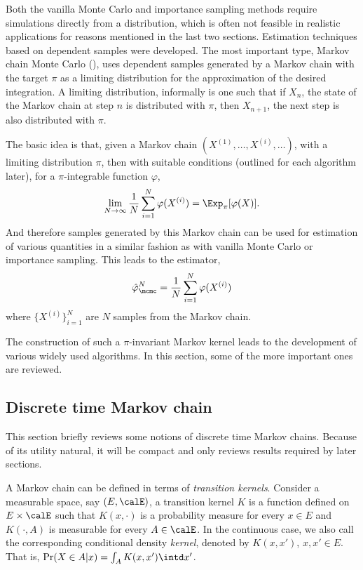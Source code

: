 Both the vanilla Monte Carlo and importance sampling methods require
simulations directly from a distribution, which is often not feasible in
realistic applications for reasons mentioned in the last two sections.
Estimation techniques based on dependent samples were developed. The most
important type, Markov chain Monte Carlo (\mcmc), uses dependent samples
generated by a Markov chain with the target $\pi$ as a limiting distribution
for the approximation of the desired integration. A limiting distribution,
informally is one such that if $X_n$, the state of the Markov chain at step
$n$ is distributed with $\pi$, then $X_{n+1}$, the next step is also
distributed with $\pi$.

The basic idea is that, given a Markov chain $(X^{(1)},\dots,X^{(i)},\dots)$,
with a limiting distribution $\pi$, then with suitable conditions (outlined
for each algorithm later), for a $\pi$-integrable function $\varphi$,
\begin{equation}
  \lim_{N\to\infty}\frac{1}{N}\sum_{i=1}^N\varphi(X^{(i)}) =
  \Exp_{\pi}[\varphi(X)].
  \label{eq:mcmc convergence}
\end{equation}
And therefore samples generated by this Markov chain can be used for
estimation of various quantities in a similar fashion as with vanilla Monte
Carlo or importance sampling. This leads to the estimator,
\begin{equation}
  \hat\varphi_{\mcmc}^N = \frac{1}{N}\sum_{i=1}^N\varphi(X^{(i)})
  \label{eq:mcmc est}
\end{equation}
where $\{X^{(i)}\}_{i=1}^N$ are $N$ samples from the Markov chain.

The construction of such a $\pi$-invariant Markov kernel leads to the
development of various widely used \mcmc algorithms. In this section, some of
the more important ones are reviewed.

\subsection{Discrete time Markov chain}
\label{sub:Discrete time Markov chain}

This section briefly reviews some notions of discrete time Markov chains.
Because of its utility natural, it will be compact and only reviews results
required by later sections.

A Markov chain can be defined in terms of \emph{transition kernels}. Consider
a measurable space, say $(E,\calE)$, a transition kernel $K$ is a function defined
on $E\times\calE$ such that $K(x,\cdot)$ is a probability measure for every
$x\in E$ and $K(\cdot,A)$ is measurable for every $A\in\calE$. In the
continuous case, we also call the corresponding conditional density
\emph{kernel}, denoted by $K(x,x')$, $x,x'\in E$. That is, $\Pr(X\in A|x) =
\int_A K(x,x')\intd x'$.

